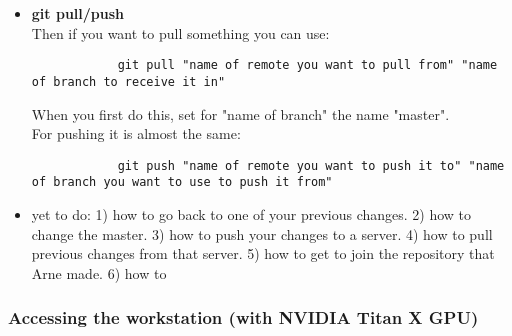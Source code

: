 \documentclass{article}
\begin{document}
\begin{itemize}
\begin{itemize}
        \item \textbf{git pull/push} \\
        Then if you want to pull something you can use:
        \begin{verbatim}
            git pull "name of remote you want to pull from" "name of branch to receive it in"
        \end{verbatim}
        When you first do this, set for "name of branch" the name "master". \\
        For pushing it is almost the same:
        \begin{verbatim}
            git push "name of remote you want to push it to" "name of branch you want to use to push it from"
        \end{verbatim}
        
        
        
        \item yet to do: 1) how to go back to one of your previous changes. 2) how to change the master. 3) how to push your changes to a server. 4) how to pull previous changes from that server. 5) how to get to join the repository that Arne made. 6) how to 
    \end{itemize}
\end{itemize}


\subsubsection{Accessing the workstation (with NVIDIA Titan X GPU)}
\end{document}
